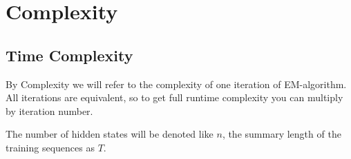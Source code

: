 \documentclass[thesis=M,english]{FITthesis}[2012/10/20]
\begin{document}
\FloatBarrier

\section{Complexity}\label{sec:complex}

\subsection{Time Complexity}

By Complexity we will refer to the complexity of one iteration of EM-algorithm. All iterations are equivalent, so to get full runtime complexity you can multiply by iteration number.

The number of hidden states will be denoted like $n$, the summary length of the training sequences as $T$. 
\end{document}
